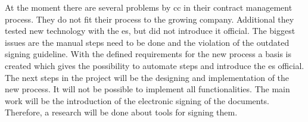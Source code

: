 At the moment there are several problems by \gls{cc} in their contract management process. They do not fit their process to the growing company. Additional they tested new technology with the \gls{es}, but did not introduce it official. The biggest issues are the manual steps need to be done and the violation of the outdated signing guideline. \newline
With the defined requirements for the new process a basis is created which gives the possibility to automate steps and introduce the \gls{es} official. The next steps in the project will be the designing and implementation of the new process. It will not be possible to implement all functionalities. The main work will be the introduction of the electronic signing of the documents. Therefore, a research will be done about tools for signing them. 
